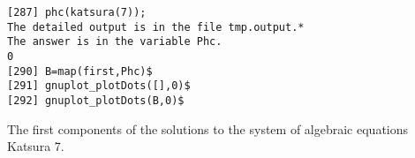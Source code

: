 \documentclass{slides}
\begin{document}
\epsfxsize=17cm
\begin{center}
\end{center}

\newpage


\begin{verbatim}
[287] phc(katsura(7));
The detailed output is in the file tmp.output.*
The answer is in the variable Phc.
0
[290] B=map(first,Phc)$
[291] gnuplot_plotDots([],0)$
[292] gnuplot_plotDots(B,0)$
\end{verbatim}

\epsfxsize=17cm
\begin{center}
\end{center}
The first components of the solutions to the system of algebraic equations Katsura 7.
\newpage
\end{document}

